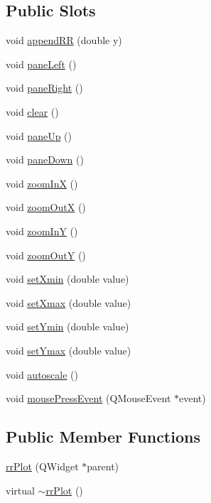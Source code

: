 \subsection*{Public Slots}
\begin{DoxyCompactItemize}
\item 
void \hyperlink{classrr_plot_ae2dd42e0e8f94bc4b1f9b4bc5e917bcb}{append\+R\+R} (double y)
\item 
void \hyperlink{classrr_plot_a4330236961be8adaf9fb44ce45b5b63a}{pane\+Left} ()
\item 
void \hyperlink{classrr_plot_a1294ab460597423936b3e07bc009c174}{pane\+Right} ()
\item 
void \hyperlink{classrr_plot_aa967ef18a8edb8ecd196198f10ecb97c}{clear} ()
\item 
void \hyperlink{classrr_plot_a9f78ddedf799bbe3cd8aa5cc1dbabd77}{pane\+Up} ()
\item 
void \hyperlink{classrr_plot_aeff81faaf8baf44874d58796298f2643}{pane\+Down} ()
\item 
void \hyperlink{classrr_plot_a6a5832444faeae2ec648cf512f44c66d}{zoom\+In\+X} ()
\item 
void \hyperlink{classrr_plot_a7c31bb252d002579c04a8038370685d7}{zoom\+Out\+X} ()
\item 
void \hyperlink{classrr_plot_a368f1da9929e078f53a1195fe54eaa56}{zoom\+In\+Y} ()
\item 
void \hyperlink{classrr_plot_a884169d9fccdd99d51f354d53fa3f1ab}{zoom\+Out\+Y} ()
\item 
void \hyperlink{classrr_plot_a69724f1f3c7623d83a599a86c6036261}{set\+Xmin} (double value)
\item 
void \hyperlink{classrr_plot_adf7f0349309cc79fcc6613fdb6613961}{set\+Xmax} (double value)
\item 
void \hyperlink{classrr_plot_a7254d3098b111df47e9d9e0ba3fe7dfd}{set\+Ymin} (double value)
\item 
void \hyperlink{classrr_plot_af85cc052d86396309c0eae44543f8c1b}{set\+Ymax} (double value)
\item 
void \hyperlink{classrr_plot_a744a715c88372fcf875370a213255d34}{autoscale} ()
\item 
void \hyperlink{classrr_plot_aeda7c441255d2d644222997b268d600e}{mouse\+Press\+Event} (Q\+Mouse\+Event $\ast$event)
\end{DoxyCompactItemize}
\subsection*{Public Member Functions}
\begin{DoxyCompactItemize}
\item 
\hyperlink{classrr_plot_a1670fc13172e2a65ed9c10fe2c65f53a}{rr\+Plot} (Q\+Widget $\ast$parent)
\item 
virtual \hyperlink{classrr_plot_a4804c1ab8d3cc373b8e12d660ea2dba6}{$\sim$rr\+Plot} ()
\end{DoxyCompactItemize}

